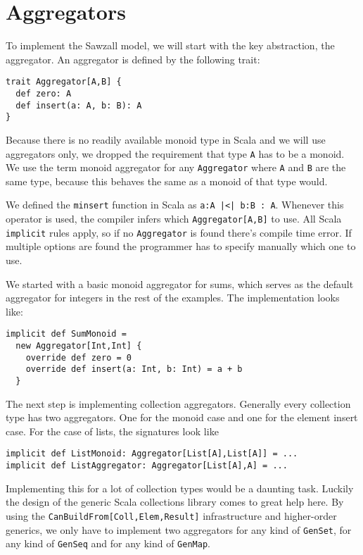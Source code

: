 \documentclass[10pt,a4paper]{article}
\begin{document}
\section{Aggregators}

To implement the Sawzall model, we will start with the key abstraction, the aggregator. An aggregator is defined by the following trait:
\begin{lstlisting}
trait Aggregator[A,B] {
  def zero: A
  def insert(a: A, b: B): A
}
\end{lstlisting}
Because there is no readily available monoid type in Scala and we will use aggregators only, we dropped the requirement that type \lstinline|A| has to be a monoid. We use the term monoid aggregator for any \lstinline|Aggregator| where \lstinline|A| and \lstinline|B| are the same type, because this behaves the same as a monoid of that type would.

We defined the \lstinline[language=haskell]|minsert| function in Scala as \lstinline!a:A |<| b:B : A!. Whenever this operator is used, the compiler infers which \lstinline|Aggregator[A,B]| to use. All Scala \lstinline|implicit| rules apply, so if no \lstinline|Aggregator| is found there's compile time error. If multiple options are found the programmer has to specify manually which one to use.

We started with a basic monoid aggregator for sums, which serves as the default aggregator for integers in the rest of the examples. The implementation looks like:
\begin{lstlisting}
implicit def SumMonoid =
  new Aggregator[Int,Int] {
    override def zero = 0
    override def insert(a: Int, b: Int) = a + b
  }
\end{lstlisting}

The next step is implementing collection aggregators. Generally every collection type has two aggregators. One for the monoid case and one for the element insert case. For the case of lists, the signatures look like
\begin{lstlisting}
implicit def ListMonoid: Aggregator[List[A],List[A]] = ...
implicit def ListAggregator: Aggregator[List[A],A] = ...
\end{lstlisting}

Implementing this for a lot of collection types would be a daunting task. Luckily the design of the generic Scala collections library \citep{odersky2009fighting} comes to great help here. By using the \lstinline|CanBuildFrom[Coll,Elem,Result]| infrastructure and higher-order generics, we only have to implement two aggregators for any kind of \lstinline|GenSet|, for any kind of \lstinline|GenSeq| and for any kind of \lstinline|GenMap|.
\end{document}
